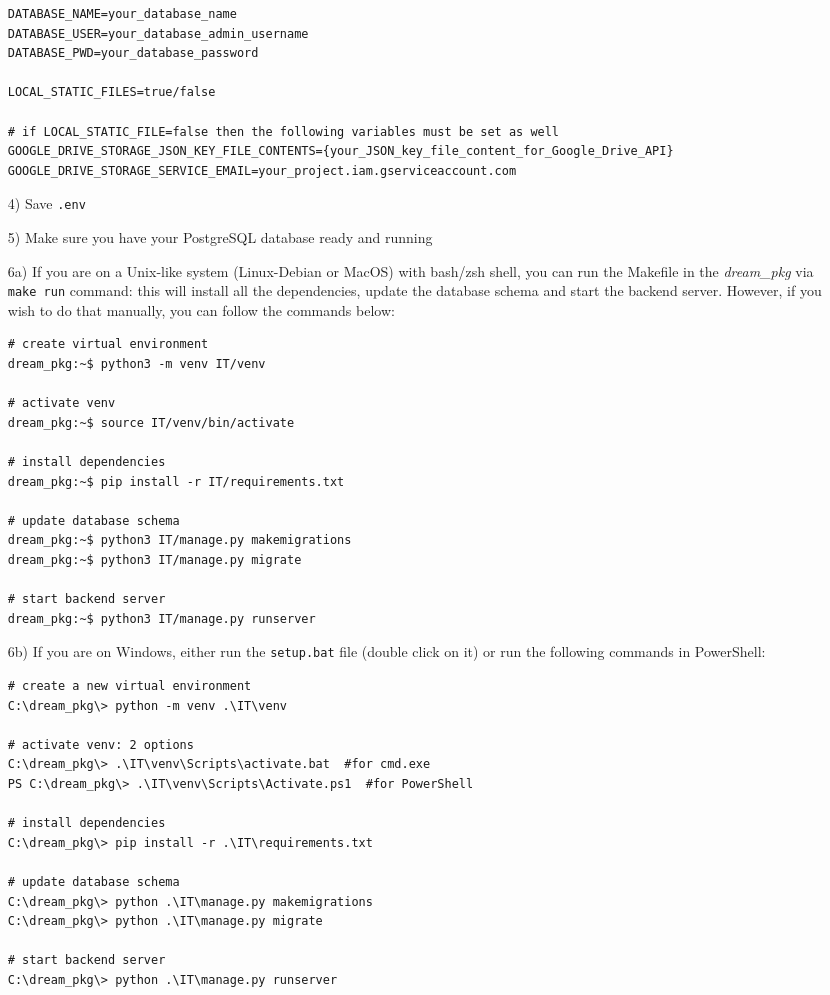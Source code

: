 \documentclass[table, 12pt]{article}
\begin{document}
\begin{itemize}
\begin{lstlisting}[language=shell]
DATABASE_NAME=your_database_name
DATABASE_USER=your_database_admin_username
DATABASE_PWD=your_database_password

LOCAL_STATIC_FILES=true/false

# if LOCAL_STATIC_FILE=false then the following variables must be set as well
GOOGLE_DRIVE_STORAGE_JSON_KEY_FILE_CONTENTS={your_JSON_key_file_content_for_Google_Drive_API}
GOOGLE_DRIVE_STORAGE_SERVICE_EMAIL=your_project.iam.gserviceaccount.com
    \end{lstlisting}  
    \item[4)] Save \texttt{.env}
    \item[5)] Make sure you have your PostgreSQL database ready and running
    \item[6a)] If you are on a Unix-like system (Linux-Debian or MacOS) with bash/zsh shell, you can run the Makefile in the \textit{dream\_pkg} via \texttt{make run} command: this will install all the dependencies, update the database schema and start the backend server. However, if you wish to do that manually, you can follow the commands below:
    \begin{lstlisting}[language=shell]
# create virtual environment
dream_pkg:~$ python3 -m venv IT/venv

# activate venv
dream_pkg:~$ source IT/venv/bin/activate

# install dependencies
dream_pkg:~$ pip install -r IT/requirements.txt

# update database schema
dream_pkg:~$ python3 IT/manage.py makemigrations
dream_pkg:~$ python3 IT/manage.py migrate

# start backend server
dream_pkg:~$ python3 IT/manage.py runserver
    \end{lstlisting}
    \item[6b)] If you are on Windows, either run the \texttt{setup.bat} file (double click on it) or run the following commands in PowerShell:
    \begin{lstlisting}[language=shell]
# create a new virtual environment
C:\dream_pkg\> python -m venv .\IT\venv

# activate venv: 2 options
C:\dream_pkg\> .\IT\venv\Scripts\activate.bat  #for cmd.exe
PS C:\dream_pkg\> .\IT\venv\Scripts\Activate.ps1  #for PowerShell
  
# install dependencies
C:\dream_pkg\> pip install -r .\IT\requirements.txt

# update database schema
C:\dream_pkg\> python .\IT\manage.py makemigrations
C:\dream_pkg\> python .\IT\manage.py migrate

# start backend server
C:\dream_pkg\> python .\IT\manage.py runserver
    \end{lstlisting}
\end{itemize}
\end{document}
